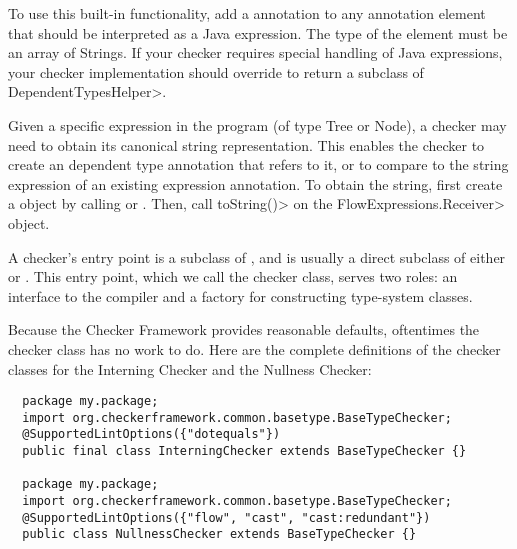 To use this built-in functionality, add a  annotation
to any annotation element that should be interpreted as a Java expression.  The type of the
element must be an array of Strings.  If your checker requires special handling of Java expressions,
your checker implementation should override
to return a subclass of \<DependentTypesHelper>.

Given a specific expression in the program (of type Tree or Node), a
checker may need to obtain its canonical string representation.  This
enables the checker to create an dependent type annotation that refers to
it, or to compare to the string expression of an existing expression
annotation.
To obtain the string, first create a
 object by calling
 or
.
Then, call \<toString()> on the \<FlowExpressions.Receiver> object.



A checker's entry point is a subclass of
, and is usually a direct subclass
of either  or
.
This entry
point, which we call the checker class, serves two
roles:  an interface to the compiler and a factory for constructing
type-system classes.

Because the Checker Framework provides reasonable defaults, oftentimes the
checker class has no work to do.  Here are the complete definitions of the
checker classes for the Interning Checker and the Nullness Checker:

\begin{Verbatim}
  package my.package;
  import org.checkerframework.common.basetype.BaseTypeChecker;
  @SupportedLintOptions({"dotequals"})
  public final class InterningChecker extends BaseTypeChecker {}

  package my.package;
  import org.checkerframework.common.basetype.BaseTypeChecker;
  @SupportedLintOptions({"flow", "cast", "cast:redundant"})
  public class NullnessChecker extends BaseTypeChecker {}
\end{Verbatim}


